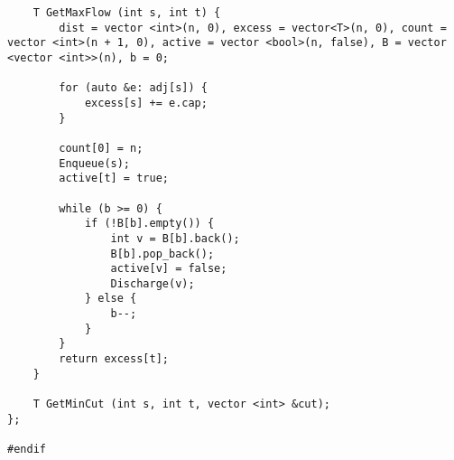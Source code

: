 \documentclass[a4paper]{article}
\begin{document}
\begin{verbatim}
    T GetMaxFlow (int s, int t) {
        dist = vector <int>(n, 0), excess = vector<T>(n, 0), count = vector <int>(n + 1, 0), active = vector <bool>(n, false), B = vector <vector <int>>(n), b = 0;
        
        for (auto &e: adj[s]) {
            excess[s] += e.cap;
        }

        count[0] = n;
        Enqueue(s);
        active[t] = true;
        
        while (b >= 0) {
            if (!B[b].empty()) {
                int v = B[b].back();
                B[b].pop_back();
                active[v] = false;
                Discharge(v);
            } else {
                b--;
            }
        }
        return excess[t];
    }

    T GetMinCut (int s, int t, vector <int> &cut);
};

#endif
    \end{verbatim}
\end{document}
